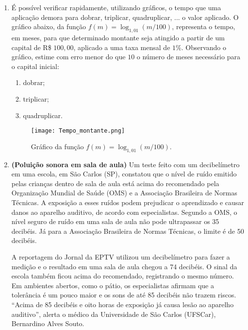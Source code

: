 \begin{enumerate}

\item É possível verificar rapidamente, utilizando gráficos, o tempo que uma aplicação demora para dobrar, triplicar, quadruplicar, ... o valor aplicado. O gráfico abaixo, da função $f(m)=\log_{1{,}01}(m/100)$, representa o tempo, em meses, para que determinado montante seja atingido a partir de um capital de R\$ $100{,}00$, aplicado a uma taxa mensal de $1\%$.  Observando o gráfico, estime com erro menor do que $10$ o número de meses necessário para o capital inicial:
\begin{enumerate}
\item dobrar;
\item triplicar;
\item quadruplicar.
\end{enumerate}

\begin{figure}[H]
\centering

\texttt{[image: Tempo\_montante.png]}
\caption{Gráfico da função $f(m)=\log_{1{,}01} (m/100)$.}
\label{EstimaGraf}
\end{figure}

\item {}\label{poluicaoSonora}

\textbf{(Poluição sonora em sala de aula)} Um teste feito com um decibelímetro em uma escola, em São Carlos (SP), 
constatou que o nível de ruído emitido pelas crianças dentro de sala de aula está acima do recomendado pela Organização 
Mundial de Saúde  (OMS) e a Associação Brasileira de Normas Técnicas. A exposição a esses ruídos podem prejudicar o 
aprendizado e causar danos ao aparelho auditivo, de acordo com especialistas.
Segundo a OMS, o nível seguro de ruído em uma sala de aula não pode ultrapassar os 35 decibéis. Já para a Associação Brasileira de Normas Técnicas, o limite é de 50 decibéis.

A reportagem do Jornal da EPTV utilizou um decibelímetro para fazer a medição e o resultado em uma sala de aula chegou a 74 decibéis. O sinal da escola também ficou acima do recomendado, registrando o mesmo número. Em ambientes abertos, como o pátio, os especialistas afirmam que a tolerância é um pouco maior e os sons de até 85 decibéis não trazem riscos. “Acima de 85 decibéis e oito horas de exposição já causa lesão ao aparelho auditivo”, alerta 
o médico da Universidade de São Carlos (UFSCar), Bernardino Alves Souto.


\end{enumerate}
